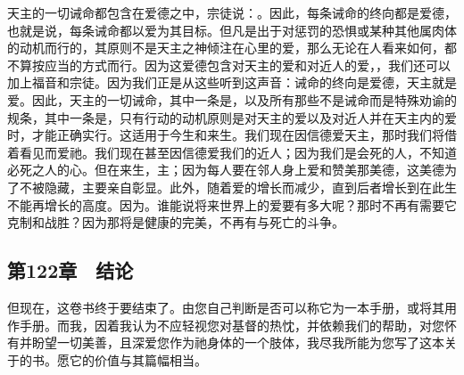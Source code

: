 天主的一切诫命都包含在爱德之中，宗徒说：。因此，每条诫命的终向都是爱德，也就是说，每条诫命都以爱为其目标。但凡是出于对惩罚的恐惧或某种其他属肉体的动机而行的，其原则不是天主之神倾注在心里的爱，那么无论在人看来如何，都不算按应当的方式而行。因为这爱德包含对天主的爱和对近人的爱，，我们还可以加上福音和宗徒。因为我们正是从这些听到这声音：诫命的终向是爱德，天主就是爱。因此，天主的一切诫命，其中一条是，以及所有那些不是诫命而是特殊劝谕的规条，其中一条是，只有行动的动机原则是对天主的爱以及对近人并在天主内的爱时，才能正确实行。这适用于今生和来生。我们现在因信德爱天主，那时我们将借着看见而爱祂。我们现在甚至因信德爱我们的近人；因为我们是会死的人，不知道必死之人的心。但在来生，主；因为每人要在邻人身上爱和赞美那美德，这美德为了不被隐藏，主要亲自彰显。此外，随着爱的增长而减少，直到后者增长到在此生不能再增长的高度。因为。谁能说将来世界上的爱要有多大呢？那时不再有需要它克制和战胜？因为那将是健康的完美，不再有与死亡的斗争。\par


\subsection{第122章　结论}

但现在，这卷书终于要结束了。由您自己判断是否可以称它为一本手册，或将其用作手册。而我，因着我认为不应轻视您对基督的热忱，并依赖我们的帮助，对您怀有并盼望一切美善，且深爱您作为祂身体的一个肢体，我尽我所能为您写了这本关于的书。愿它的价值与其篇幅相当。\par

